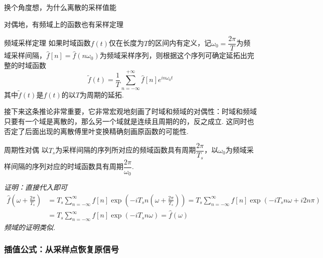 \documentclass[main.tex]{subfiles}
\begin{document}
换个角度想，为什么离散的采样值能

对偶地，有频域上的函数也有采样定理
\begin{corollary}{频域采样定理}
    如果时域函数\(f(t)\)仅在长度为\(T\)的区间内有定义，记\(\omega_0=\dfrac{2\pi}{T}\)为频域采样间隔，\(\hat{f}[n]=\hat{f}(n\omega_0)\)为频域采样序列，则根据这个序列可确定延拓出完整的时域函数
    \[\tilde{f}(t)=\frac{1}{T}\sum_{n=-\infty}^{+\infty}\hat{f}[n]e^{in\omega_0t}\]
    其中\(\tilde{f}(t)\)是\(f(t)\)的以\(T\)为周期的延拓.
\end{corollary}

接下来这条推论非常重要，它非常宏观地刻画了时域和频域的对偶性：时域和频域只要有一个域是离散的，那么另一个域就是连续且周期的的，反之成立. 这同时也否定了后面出现的离散傅里叶变换精确刻画原函数的可能性.

\begin{corollary}{周期性对偶}
    以\(T_s\)为采样间隔的序列所对应的频域函数具有周期\(\dfrac{2\pi}{T_s}\)，以\(\omega_0\)为频域采样间隔的序列对应的时域函数具有周期\(\dfrac{2\pi}{\omega_0}\).
\end{corollary}
\textit{
    证明：直接代入即可
    \begin{align*}
        \hat{f}\left(\omega+\frac{2\pi}{T_s}\right) &= T_s \sum_{n=-\infty}^{\infty}f[n]\exp\left(-iT_sn(\omega+\frac{2\pi}{T_s})\right) = T_s \sum_{n=-\infty}^{\infty}f[n]\exp\left(-iT_sn\omega+i2n\pi\right) \\
        &= T_s \sum_{n=-\infty}^{\infty}f[n]\exp(-iT_sn\omega) = \hat{f}(\omega)
    \end{align*}
    频域的证明类似.
}

\subsubsection{插值公式：从采样点恢复原信号}
\end{document}
